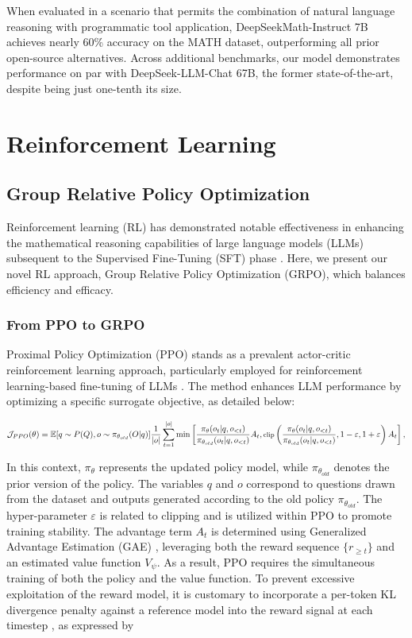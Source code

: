 When evaluated in a scenario that permits the combination of natural language reasoning with programmatic tool application, DeepSeekMath-Instruct 7B achieves nearly 60\% accuracy on the MATH dataset, outperforming all prior open-source alternatives. Across additional benchmarks, our model demonstrates performance on par with DeepSeek-LLM-Chat 67B, the former state-of-the-art, despite being just one-tenth its size.

\section{Reinforcement Learning}

\subsection{Group Relative Policy Optimization}
Reinforcement learning (RL) has demonstrated notable effectiveness in enhancing the mathematical reasoning capabilities of large language models (LLMs) subsequent to the Supervised Fine-Tuning (SFT) phase \citep{wang2023math,wizardmath}. Here, we present our novel RL approach, Group Relative Policy Optimization (GRPO), which balances efficiency and efficacy.

\subsubsection{From PPO to GRPO} Proximal Policy Optimization (PPO) \citep{schulman2017proximal} stands as a prevalent actor-critic reinforcement learning approach, particularly employed for reinforcement learning-based fine-tuning of LLMs \citep{ouyang2022training}. The method enhances LLM performance by optimizing a specific surrogate objective, as detailed below:

\begin{equation}
\footnotesize
    \mathcal{J}_{PPO}(\theta) = \mathbb{E}{[q \sim P(Q), o \sim \pi_{\theta_{old}}(O|q)]} \frac{1}{|o|} \sum_{t=1}^{|o|} \min \left[ \frac{\pi_\theta(o_{t} | q, o_{<t})}{\pi_{\theta_{old}}(o_{t} | q, o_{<t})} A_{t}, \text{clip} \left( \frac{\pi_\theta(o_{t} | q, o_{<t})}{\pi_{\theta_{old}}(o_{t} | q, o_{<t})}, 1 - \varepsilon, 1 + \varepsilon \right)  A_{t} \right] ,
\end{equation}

In this context, $\pi_{\theta}$ represents the updated policy model, while $\pi_{\theta_{old}}$ denotes the prior version of the policy. The variables $q$ and $o$ correspond to questions drawn from the dataset and outputs generated according to the old policy $\pi_{\theta_{old}}$. The hyper-parameter $\varepsilon$ is related to clipping and is utilized within PPO to promote training stability. The advantage term $A_t$ is determined using Generalized Advantage Estimation (GAE) \citep{gae}, leveraging both the reward sequence $\{r_{\ge t}\}$ and an estimated value function $V_{\psi}$. As a result, PPO requires the simultaneous training of both the policy and the value function. To prevent excessive exploitation of the reward model, it is customary to incorporate a per-token KL divergence penalty against a reference model into the reward signal at each timestep \citep{ouyang2022training}, as expressed by

